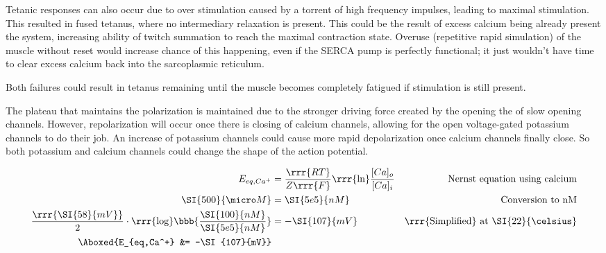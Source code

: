 \documentclass[plain,basic]{inVerba-notes}
\begin{document}
\begin{enumerate}
  Tetanic responses can also occur due to over stimulation caused by a torrent of high frequency impulses, leading to maximal stimulation. This resulted in fused tetanus, where no intermediary relaxation is present. This could be the result of excess calcium being already present the system, increasing ability of twitch summation to reach the maximal contraction state. Overuse (repetitive rapid simulation) of the muscle without reset would increase chance of this happening, even if the SERCA pump is perfectly functional; it just wouldn't have time to clear excess calcium back into the sarcoplasmic reticulum.

  Both failures could result in tetanus remaining until the muscle becomes completely fatigued if stimulation is still present.


  The plateau that maintains the polarization is maintained due to the stronger driving force created by the opening the of slow opening  channels. However, repolarization will occur once there is closing of calcium channels, allowing for the open voltage-gated potassium channels to do their job. An increase of potassium channels could cause more rapid depolarization once calcium channels finally close. So both potassium and calcium channels could change the shape of the action potential.
  
  \begin{align*}
      E_{eq,Ca^+} &= \frac{\rrr{RT}}{Z\rrr{F}}\text{\rrr{ln}}{\frac{[Ca]_{o}}{[Ca]_{i}}} & \text{Nernst equation using calcium} \\
      \SI{500}{\micro M} &= \SI{5e5}{nM} & \text{Conversion to nM}\\
      \frac{\rrr{\SI{58}{mV}}}{2}\cdot \rrr{\text{log}}\bbb{\frac{\SI{100}{nM}}{\SI{5e5}{nM}}}&=-\SI{107}{mV} & \text{\rrr{Simplified} at \SI{22}{\celsius}}\\
      \Aboxed{E_{eq,Ca^+} &= -\SI{107}{mV}}
  \end{align*}


\end{enumerate}
\end{document}
